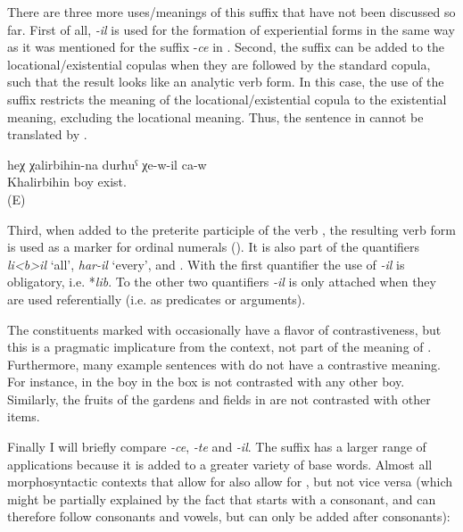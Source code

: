 There are three more uses\slash meanings of this suffix that have not been discussed so far. First of all, \textit{-il} is used for the formation of experiential forms in the same way as it was mentioned for the suffix -\textit{ce} in . Second, the suffix  can be added to the locational/existential copulas when they are followed by the standard copula, such that the result looks like an analytic verb form. In this case, the use of the suffix restricts the meaning of the locational/existential copula to the existential meaning, excluding the locational meaning. Thus, the sentence in  cannot be translated by .
%
\begin{exe}
	\ex	\label{ex:The son of Khalirbihin should be there (i.e. be still alive) minor}
	\gll	heχ	χalirbihin-na	durħuˁ	χe-w-il	ca-w\\
			Khalirbihin	boy	exist.	\\
	\glt	{} (E)
\end{exe}
	
Third, when added to the preterite participle of the verb  , the resulting verb form is used as a marker for ordinal numerals (). It is also part of the quantifiers \textit{li<b>il} `all', \textit{har-il} `every', and  . With the first quantifier the use of \textit{-il} is obligatory, i.e. *\textit{lib}. To the other two quantifiers \textit{-il} is only attached when they are used referentially (i.e. as predicates or arguments). 

The constituents marked with  occasionally have a flavor of contrastiveness, but this is a pragmatic implicature from the context, not part of the meaning of . Furthermore, many example sentences with  do not have a contrastive meaning. For instance, in  the boy in the box is not contrasted with any other boy. Similarly, the fruits of the gardens and fields in  are not contrasted with other items.

Finally I will briefly compare \textit{-ce}, \textit{-te} and \textit{-il}. The suffix  has a larger range of applications because it is added to a greater variety of base words. Almost all morphosyntactic contexts that allow for  also allow for , but not vice versa (which might be partially explained by the fact that  starts with a consonant, and can therefore follow consonants and vowels, but  can only be added after consonants):

